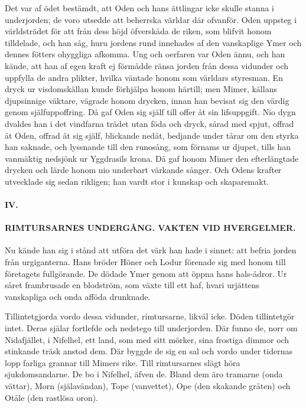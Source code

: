 Det var af ödet bestämdt, att Oden och hans ättlingar icke skulle stanna
i underjorden; de voro utsedde att beherrska världar där ofvanför. Oden
uppsteg i världsträdet för att från dess höjd öfverskåda de riken, som
blifvit honom tilldelade, och han såg, huru jordens rund innehades af
den vanskaplige Ymer och dennes fötters ohyggliga afkomma. Ung och
oerfaren var Oden ännu, och han kände, att han af egen kraft ej förmådde
ränsa jorden från dessa vidunder och uppfylla de andra plikter, hvilka
väntade honom som världars styresman. En dryck ur visdomskällan kunde
förhjälpa honom härtill; men Mimer, källans djupsinnige väktare, vägrade
honom drycken, innan han bevisat sig den värdig genom själfuppoffring.
Då gaf Oden sig själf till offer åt sin lifsuppgift. Nio dygn dvaldes
han i det vindfarna trädet utan föda och dryck, sårad med spjut, offrad
åt Oden, offrad
\protect\hypertarget{lb1625905.xhtmlux5cux23start7}{}{}\protect\hypertarget{lb1625905.xhtmlux5cux23start7-a}{}{}\protect\hypertarget{lb1625905.xhtmlux5cux23start7-b}{}{}\protect\hypertarget{lb1625905.xhtmlux5cux23start7-c}{}{}\protect\hypertarget{lb1625905.xhtmlux5cux23start7-d}{}{}
åt sig själf, blickande nedåt, bedjande under tårar om den styrka han
saknade, och lyssnande till den runosång, som förnams ur djupet, tills
han vanmäktig nedsjönk ur Yggdrasils krona. Då gaf honom Mimer den
efterlängtade drycken och lärde honom nio underbart värkande sånger. Och
Odens krafter utvecklade sig sedan rikligen; han vardt stor i kunskap
och skaparemakt.

\paragraph{IV.}

\paragraph{RIMTURSARNES UNDERGÅNG. VAKTEN VID HVERGELMER.}

Nu kände han sig i stånd att utföra det värk han hade i sinnet: att
befria jorden från urgiganterna. Hans bröder Höner och Lodur förenade
sig med honom till företagets fullgörande. De dödade Ymer genom att
öppna hans hals-ådror. Ur såret frambrusade en blodström, som växte till
ett haf, hvari urjättens vanskapliga och onda afföda drunknade.

Tillintetgjorda vordo dessa vidunder, rimtursarne, likväl icke. Döden
tillintetgör intet. Deras själar fortlefde och nedstego till
underjorden. Där funno de, norr om Nidafjället, i Nifelhel, ett land,
som med sitt mörker, sina frostiga dimmor och stinkande träsk anstod
dem. Där byggde de sig en sal och vordo under tidernas lopp farliga
grannar till Mimers rike. Till rimtursarnes slägt höra sjukdomsandarne.
De bo i Nifelhel, äfven de. Bland dem äro tramarne (onda vättar), Morn
(själavåndan), Tope (vanvettet), Ope (den skakande gråten) och Otåle
(den rastlösa oron).


